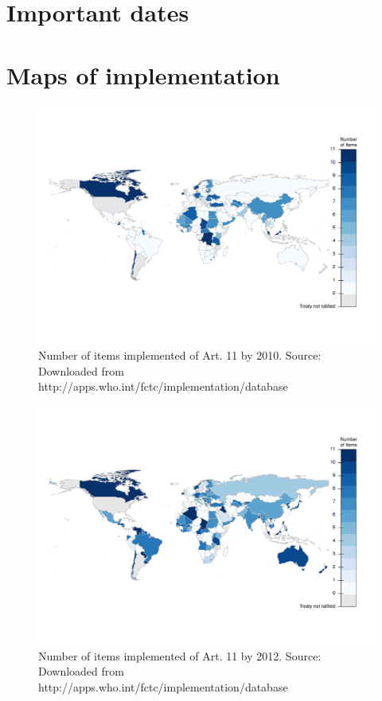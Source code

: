 \documentclass[10pt]{article}
\begin{document}
\appendix

\clearpage\section{Important dates}\label{sec:dates}



\section{Maps of implementation}

\begin{landscape}
\begin{figure}[H]
\centering
\includegraphics[width=.95\linewidth]{../fig/implementation_art11_map2010.pdf}
\caption{Number of items implemented of Art. 11 by 2010. Source: Downloaded
from http://apps.who.int/fctc/implementation/database}
\end{figure}

\begin{figure}[H]
\centering
\includegraphics[width=.95\linewidth]{../fig/implementation_art11_map2012.pdf}
\caption{Number of items implemented of Art. 11 by 2012. Source: Downloaded
from http://apps.who.int/fctc/implementation/database}
\end{figure}

\end{landscape}
\end{document}
